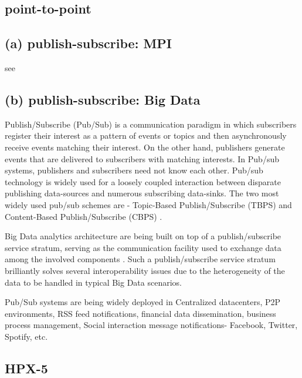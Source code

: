\subsection{point-to-point}
\subsection{(a) publish-subscribe: MPI}

     see 
     
\subsection{(b) publish-subscribe: Big Data}

     Publish/Subscribe (Pub/Sub) \cite{thesis-pub-sub} is a
     communication paradigm in which subscribers register their
     interest as a pattern of events or topics and then asynchronously
     receive events matching their interest. On the other hand,
     publishers generate events that are delivered to subscribers with
     matching interests.  In Pub/sub systems, publishers and
     subscribers need not know each other. Pub/sub technology is
     widely used for a loosely coupled interaction between disparate
     publishing data-sources and numerous subscribing data-sinks. The
     two most widely used pub/sub schemes are - Topic-Based
     Publish/Subscribe (TBPS) and Content-Based Publish/Subscribe
     (CBPS) \cite{paper-pub-sub}.
      
     Big Data analytics architecture are being built on top of a
     publish/subscribe service stratum, serving as the communication
     facility used to exchange data among the involved components
     \cite{paper-pub-sub-bigdata}. Such a publish/subscribe service
     stratum brilliantly solves several interoperability issues due to
     the heterogeneity of the data to be handled in typical Big Data
     scenarios.

     Pub/Sub systems are being widely deployed in Centralized
     datacenters, P2P environments, RSS feed notifications, financial
     data dissemination, business process management, Social
     interaction message notifications- Facebook, Twitter, Spotify,
     etc.

\subsection{HPX-5}

